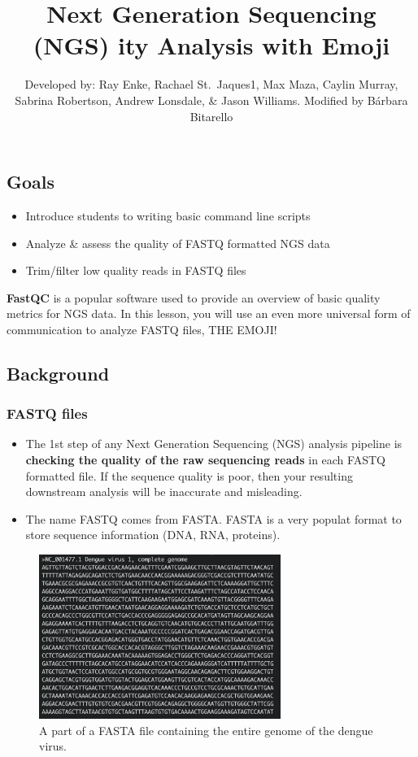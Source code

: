 \documentclass[
]{article}
\title{Next Generation Sequencing (NGS) ity Analysis with Emoji}
\subtitle{Developed by: Ray Enke, Rachael St.~Jaques1, Max Maza, Caylin
Murray, Sabrina Robertson, Andrew Lonsdale, \& Jason Williams. Modified
by Bárbara Bitarello}
\author{}
\date{\vspace{-2.5em}}
\providecommand{\tightlist}{%
  \setlength{\itemsep}{0pt}\setlength{\parskip}{0pt}}
\begin{document}
\maketitle

{
\setcounter{tocdepth}{2}
\tableofcontents
}
\hypertarget{goals}{%
\subsection{Goals}\label{goals}}

\begin{itemize}
\tightlist
\item
  Introduce students to writing basic command line scripts
\item
  Analyze \& assess the quality of FASTQ formatted NGS data
\item
  Trim/filter low quality reads in FASTQ files
\end{itemize}

\textbf{FastQC} is a popular software used to provide an overview of
basic quality metrics for NGS data. In this lesson, you will use an even
more universal form of communication to analyze FASTQ files, THE EMOJI!

\hypertarget{background}{%
\subsection{Background}\label{background}}

\hypertarget{fastq-files}{%
\subsubsection{FASTQ files}\label{fastq-files}}

\begin{itemize}
\item
  The 1st step of any Next Generation Sequencing (NGS) analysis pipeline
  is \textbf{checking the quality of the raw sequencing reads} in each
  FASTQ formatted file. If the sequence quality is poor, then your
  resulting downstream analysis will be inaccurate and misleading.
\item
  The name FASTQ comes from FASTA. FASTA is a very populat format to
  store sequence information (DNA, RNA, proteins).
\end{itemize}

\begin{figure}
\centering
\includegraphics[width=0.7\textwidth,height=\textheight]{images/fastafile.png}
\caption{A part of a FASTA file containing the entire genome of the
dengue virus.}
\end{figure}
\end{document}
